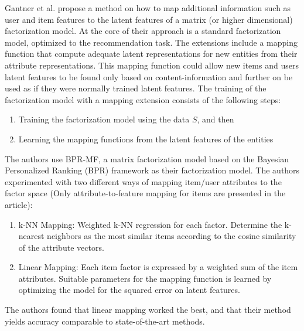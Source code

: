 
Gantner et al. \cite{Gantner2010} propose a method on how to map additional
information such as user and item features to the latent features of a matrix
(or higher dimensional) factorization model. At the core of their approach is a
standard factorization model, optimized to the recommendation task. The
extensions include a mapping function that compute adequate latent
representations for new entities from their attribute representations. This
mapping function could allow new items and users latent features to be found
only based on content-information and further on be used as if they were
normally trained latent features. The training of the factorization model with
a mapping extension consists of the following steps:

\begin{enumerate}
\item Training the factorization model using the data $S$, and then
\item Learning the mapping functions from the latent features of the entities
\end{enumerate}

The authors use BPR-MF, a matrix factorization model based on the Bayesian
Personalized Ranking (BPR) framework as their factorization model. The authors
experimented with two different ways of mapping item/user attributes to the
factor space (Only attribute-to-feature mapping for items are presented in the
article):

\begin{enumerate}
\item k-NN Mapping:	Weighted k-NN regression for each factor. Determine the
k-nearest neighbors as the most similar items according to the cosine
similarity of the attribute vectors.
\item Linear Mapping: Each item factor is expressed by a weighted sum of the
item attributes. Suitable parameters for the mapping function is learned by
optimizing the model for the squared error on latent features.
\end{enumerate}

The authors found that linear mapping worked the best, and that their method
yields accuracy comparable to state-of-the-art methods.

